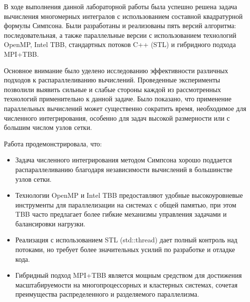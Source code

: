 \documentclass[a4paper,12pt]{article}
\begin{document}
В ходе выполнения данной лабораторной работы была успешно решена задача вычисления многомерных интегралов с использованием составной квадратурной формулы Симпсона. Были разработаны и реализованы пять версий алгоритма: последовательная, а также параллельные версии с использованием технологий OpenMP, Intel TBB, стандартных потоков C++ (STL) и гибридного подхода MPI+TBB.

Основное внимание было уделено исследованию эффективности различных подходов к распараллеливанию вычислений. Проведенные эксперименты позволили выявить сильные и слабые стороны каждой из рассмотренных технологий применительно к данной задаче. Было показано, что применение параллельных вычислений может существенно сократить время, необходимое для численного интегрирования, особенно для задач высокой размерности или с большим числом узлов сетки.

Работа продемонстрировала, что:
\begin{itemize}
    \item Задача численного интегрирования методом Симпсона хорошо поддается распараллеливанию благодаря независимости вычислений в большинстве узлов сетки.
    \item Технологии OpenMP и Intel TBB предоставляют удобные высокоуровневые инструменты для параллелизации на системах с общей памятью, при этом TBB часто предлагает более гибкие механизмы управления задачами и балансировки нагрузки.
    \item Реализация с использованием STL (std::thread) дает полный контроль над потоками, но требует более значительных усилий по разработке и отладке кода.
    \item Гибридный подход MPI+TBB является мощным средством для достижения масштабируемости на многопроцессорных и кластерных системах, сочетая преимущества распределенного и разделяемого параллелизма.
\end{itemize}

\newpage
\end{document}
